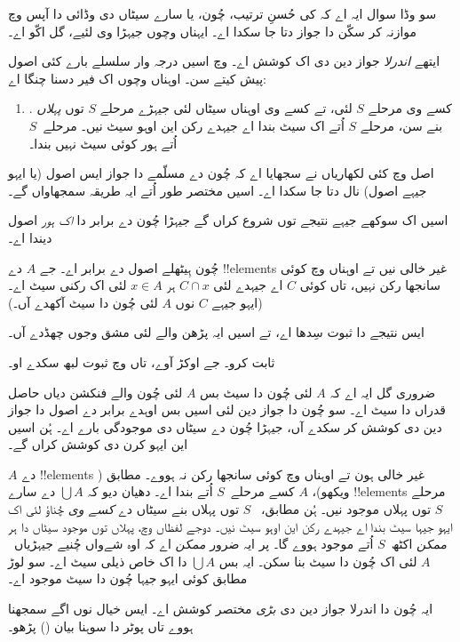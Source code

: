\documentclass[../../../include/open-logic-section]{subfiles}
\begin{document}

سو وڈا سوال ایہ اے کہ کی حُسنِ ترتیب، چُون، یا سارے سیٹاں دی وڈائی دا آپس وچ موازنہ کر سکّن دا جواز دتا جا سکدا اے۔ ایہناں وچوں جیہڑا وی لئیے، گل اکّو اے۔

ایتھے \emph{اندرلا} جواز دین دی اک کوشش اے۔  وچ اسیں درجہ وار سلسلے بارے کئی اصول پیش کیتے سن۔ اوہناں وچوں اک فیر دسنا چنگا اے:
\begin{enumerate}
	\item[] \stagesacc. کسے وی مرحلے $S$ لئی، تے کسے وی اوہناں سیٹاں لئی جیہڑے مرحلے $S$ توں \emph{پہلاں} بنے سن، مرحلے $S$ اُتے اک سیٹ بندا اے جیہدے رکن این اوہو سیٹ نیں۔ مرحلے~$S$ اُتے ہور کوئی سیٹ نہیں بندا۔
\end{enumerate}
اصل وچ کئی لکھاریاں نے سجھایا اے کہ چُون دے مسلّمے دا جواز ایس اصول (یا ایہو جیہے اصول) نال دتا جا سکدا اے۔ اسیں مختصر طور اُتے ایہ طریقہ سمجھاواں گے۔

اسیں اک سوکھے جیہے نتیجے توں شروع کراں گے جیہڑا چُون دے برابر دا \emph{اک ہور} اصول دیندا اے۔

\begin{thm}[$\ZF$ وچ]
چُون ہِیٹھلے اصول دے برابر اے۔ جے $A$ دے !!{element}s غیر خالی نیں تے اوہناں وچ کوئی سانجھا رکن نہیں، تاں کوئی $C$ اے جیہدے لئی $C
\cap x$ ہر $x \in A$ لئی اک رکنی سیٹ اے۔ (ایہو جیہے $C$ نوں $A$ لئی {چُون دا سیٹ} آکھدے آں۔)
\end{thm}

ایس نتیجے دا ثبوت سِدھا اے، تے اسیں ایہ پڑھن والے لئی مشق وجوں چھڈدے آں۔

\begin{prob}
 ثابت کرو۔ جے اوکڑ آوے، تاں \cite[pp.~242--3]{Potter2004} وچ ثبوت لبھ سکدے او۔
\end{prob}

ضروری گل ایہ اے کہ $A$ لئی چُون دا سیٹ بس $A$ لئی چُون والے فنکشن دیاں حاصل قدراں دا سیٹ اے۔ سو چُون دا جواز دین لئی اسیں بس اوہدے برابر دے اصول دا جواز دین دی کوشش کر سکدے آں، جیہڑا چُون دے سیٹاں دی موجودگی بارے اے۔ ہُن اسیں این ایہو کرن دی کوشش کراں گے۔

$A$ دے !!{element}s غیر خالی ہون تے اوہناں وچ کوئی سانجھا رکن نہ ہووے۔ \stageshier{} مطابق ( ویکھو)، $A$ کسے مرحلے~$S$ اُتے بندا اے۔ دھیان دیو کہ $\bigcup A$ دے سارے !!{element}s مرحلے $S$ توں پہلاں موجود نیں۔ ہُن \stagesacc{} مطابق، ~$S$ توں پہلاں بنے سیٹاں دے \emph{کسے وی} چُناؤ لئی اک ایہو جیہا سیٹ بندا اے جیہدے رکن این اوہو سیٹ نیں۔ دوجے لفظاں وچ، پہلاں توں موجود سیٹاں دا ہر \emph{ممکن} اکٹھ~$S$ اُتے موجود ہووے گا۔ پر ایہ ضرور \emph{ممکن} اے کہ اوہ شےواں چُنیے جیہڑیاں~$A$ لئی اک چُون دا سیٹ بنا سکن۔ ایہ بس $\bigcup A$ دا اک خاص ذیلی سیٹ اے۔ سو لوڑ مطابق کوئی ایہو جیہا چُون دا سیٹ موجود اے۔

ایہ چُون دا اندرلا جواز دین دی \emph{بڑی} مختصر کوشش اے۔ ایس خیال نوں اگے سمجھنا ہووے تاں پوٹر دا سوہنا بیان (\citeyear[\S14.8]{Potter2004}) پڑھو۔
\end{document}
